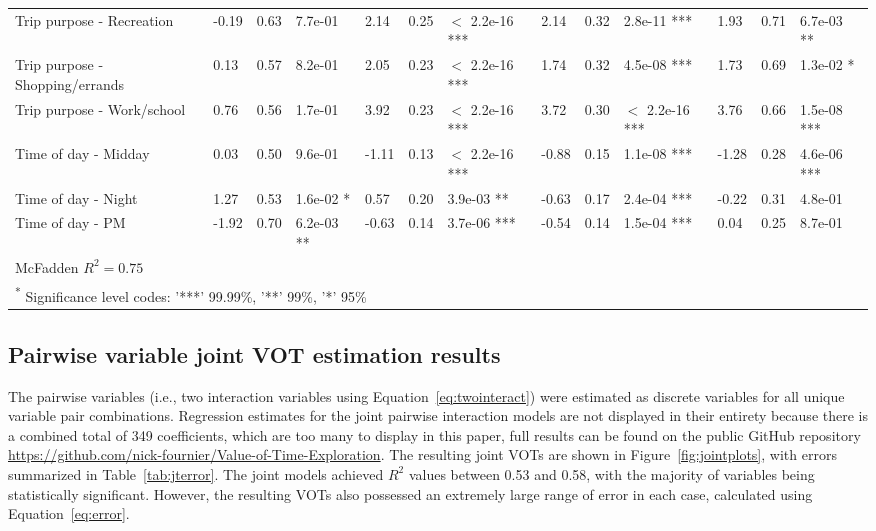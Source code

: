 \documentclass[numbered]{trbunofficial}\usepackage[]{graphicx}\usepackage[]{color}
\begin{document}
\begin{table}[!h]
\begin{tabular}{lllllllllllll}
Trip purpose - Recreation & -0.19 & 0.63 & 7.7e-01 & 2.14 & 0.25 & $<$ 2.2e-16 *** & 2.14 & 0.32 & 2.8e-11 *** & 1.93 & 0.71 & 6.7e-03 **\\
Trip purpose - Shopping/errands & 0.13 & 0.57 & 8.2e-01 & 2.05 & 0.23 & $<$ 2.2e-16 *** & 1.74 & 0.32 & 4.5e-08 *** & 1.73 & 0.69 & 1.3e-02 *\\
Trip purpose - Work/school & 0.76 & 0.56 & 1.7e-01 & 3.92 & 0.23 & $<$ 2.2e-16 *** & 3.72 & 0.30 & $<$ 2.2e-16 *** & 3.76 & 0.66 & 1.5e-08 ***\\
Time of day - Midday & 0.03 & 0.50 & 9.6e-01 & -1.11 & 0.13 & $<$ 2.2e-16 *** & -0.88 & 0.15 & 1.1e-08 *** & -1.28 & 0.28 & 4.6e-06 ***\\
Time of day - Night & 1.27 & 0.53 & 1.6e-02 * & 0.57 & 0.20 & 3.9e-03 ** & -0.63 & 0.17 & 2.4e-04 *** & -0.22 & 0.31 & 4.8e-01\\
Time of day - PM & -1.92 & 0.70 & 6.2e-03 ** & -0.63 & 0.14 & 3.7e-06 *** & -0.54 & 0.14 & 1.5e-04 *** & 0.04 & 0.25 & 8.7e-01\\
\bottomrule
\multicolumn{13}{l}{McFadden $R^2=0.75$}\\
\multicolumn{13}{l}{\textsuperscript{*} Significance level codes: '***' 99.99\%, '**' 99\%, '*' 95\%}\\
\end{tabular}
\endgroup{}


\end{table}

\pagebreak

\subsection{Pairwise variable joint VOT estimation results}
The pairwise variables (i.e., two interaction variables using Equation~\eqref{eq:twointeract}) were estimated as discrete variables for all unique variable pair combinations. Regression estimates for the joint pairwise interaction models are not displayed in their entirety because there is a combined total of 349 coefficients, which are too many to display in this paper, full results can be found on the public GitHub repository \url{https://github.com/nick-fournier/Value-of-Time-Exploration}. The resulting joint VOTs are shown in Figure~\ref{fig:jointplots}, with errors summarized in Table~\ref{tab:jterror}. The joint models achieved $R^2$ values between 0.53 and 0.58, with the majority of variables being statistically significant. However, the resulting VOTs also possessed an extremely large range of error in each case, calculated using Equation~\eqref{eq:error}.
\end{document}

